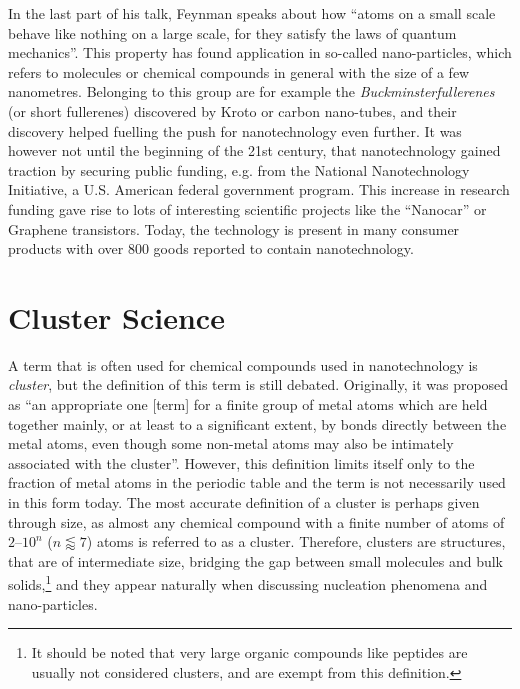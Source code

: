 In the last part of his talk, Feynman speaks about how ``atoms on a small scale
behave like nothing on a large scale, for they satisfy the laws of quantum
mechanics''. This property has found application in so-called nano-particles,
which refers to molecules or chemical compounds in general with the size of a
few nanometres. Belonging to this group are for example the
\emph{Buckminsterfullerenes} (or short fullerenes) discovered by
Kroto\autocite{Kroto_C60Buckminsterfullerene_1985} or carbon
nano-tubes\autocite{Iijima_Helicalmicrotubulesgraphitic_1991}, and their
discovery helped fuelling the push for nanotechnology even further. It was
however not until the beginning of the 21st century, that nanotechnology gained
traction by securing public funding, e.g. from the National Nanotechnology
Initiative, a U.S. American federal government program. This increase in
research funding gave rise to lots of interesting scientific projects like the
``Nanocar''\autocite{Kudernac_Electricallydrivendirectional_2011} or Graphene
transistors.\autocite{Wu_Highfrequencyscaledgraphene_2011} Today, the technology
is present in many consumer products with over 800 goods reported to contain
nanotechnology.\autocite{Vance_Nanotechnologyrealworld_2015}

\section{Cluster Science}
\label{sec:ClusterScience}

A term that is often used for chemical compounds used in nanotechnology is
\emph{cluster}, but the definition of this term is still debated. Originally, it
was proposed as ``an appropriate one [term] for a finite group of metal atoms
which are held together mainly, or at least to a significant extent, by bonds
directly between the metal atoms, even though some non-metal atoms may also be
intimately associated with the
cluster''.\autocite{Cotton_MetalAtomClusters_1964} However, this definition
limits itself only to the fraction of metal atoms in the periodic table and the
term is not necessarily used in this form today. The most accurate definition of
a cluster is perhaps given through size, as almost any chemical compound with a
finite number of atoms of $2$--$10^n$ ($n\lessapprox 7$) atoms is referred to as
a
cluster.\autocite{Johnston_Atomicmolecularclusters_2002,Wales_Energylandscapes_2003}
Therefore, clusters are structures, that are of intermediate size, bridging the
gap between small molecules and bulk solids,\footnote{It should be noted that
very large organic compounds like peptides are usually not considered clusters,
and are exempt from this definition.} and they appear naturally when discussing
nucleation phenomena and nano-particles. 

